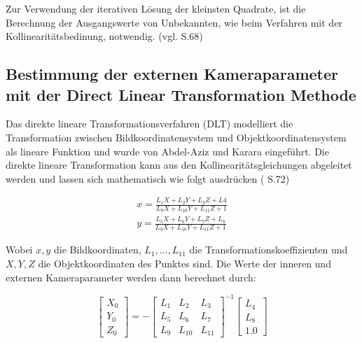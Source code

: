Zur Verwendung der iterativen Lösung der kleinsten Quadrate, ist die Berechnung der Ausgangswerte von Unbekannten, wie beim Verfahren mit der Kollinearitätsbedinung, notwendig. (vgl. \cite{comparative_conditions_study} S.68)


\subsection{Bestimmung der externen Kameraparameter mit der Direct Linear Transformation Methode}

Das \glqq direkte lineare Transformationsverfahren\grqq{} (DLT) modelliert die Transformation zwischen Bildkoordinatensystem und Objektkoordinatensystem als lineare Funktion und wurde von Abdel-Aziz und Karara \cite{dlt_intro} eingeführt. Die direkte lineare Transformation kann aus den Kollinearitätsgleichungen abgeleitet werden und lassen sich mathematisch wie folgt ausdrücken (\cite{dlt} S.72)

\begin{equation}
\begin{aligned}
x=\frac{L_1X+L_2Y+L_3Z+L4}{L_9X+L_{10}Y+L_{11}Z+1} \\
y=\frac{L_5X+L_6Y+L_7Z+L_8}{L_9X+L_{10}Y+L_{11}Z+1}
\end{aligned}
\end{equation}

Wobei $x,y$ die Bildkoordinaten, $L_1,...,L_{11}$ die Transformationskoeffizienten und $X,Y,Z$ die Objektkoordinaten des Punktes sind. Die Werte der inneren und externen Kameraparameter werden dann berechnet durch:

\begin{equation}
\begin{bmatrix}
X_0 \\ Y_0 \\ Z_0 
\end{bmatrix}
 = -
 \begin{bmatrix}
 L_1 & L_2 & L_3 \\
 L_5 & L_6 & L_7 \\
 L_9 & L_{10} & L_{11}
 \end{bmatrix}^{-1}
 \begin{bmatrix}
 L_4 \\ L_8 \\ 1.0
 \end{bmatrix}
 \end{equation}
 
